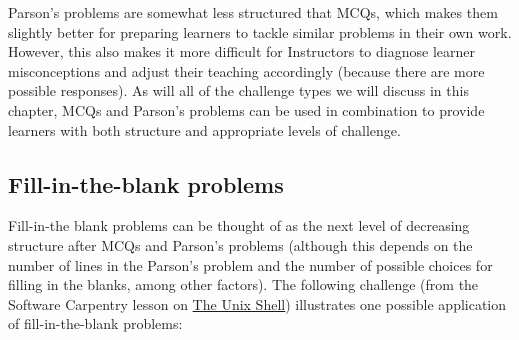 \documentclass[]{book}
\begin{document}
Parson's problems are somewhat less structured that MCQs, which makes them slightly
better for preparing learners to tackle similar problems in their own work. However, this also
makes it more difficult for Instructors to diagnose learner misconceptions and adjust their
teaching accordingly (because there are more possible responses). As will all of the challenge
types we will discuss in this chapter, MCQs and Parson's problems can be used in combination
to provide learners with both structure and appropriate levels of challenge.

\hypertarget{fill-in-the-blank-problems}{%
\subsection{Fill-in-the-blank problems}\label{fill-in-the-blank-problems}}

Fill-in-the blank problems can be thought of as the next level of decreasing structure after
MCQs and Parson's problems (although this depends on the number of lines in the Parson's
problem and the number of possible choices for filling in the blanks, among other factors).
The following challenge (from the Software Carpentry lesson on
\href{http://swcarpentry.github.io/shell-novice/}{The Unix Shell}) illustrates one possible
application of fill-in-the-blank problems:
\end{document}
